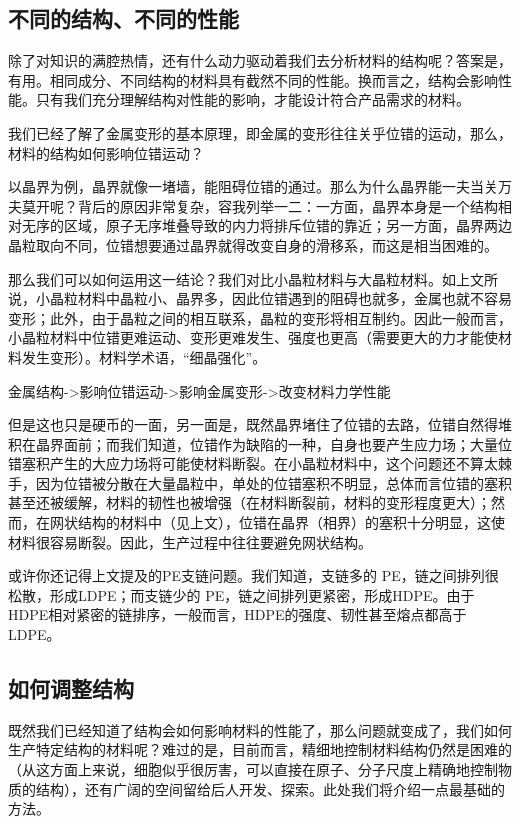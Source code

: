 \subsection{不同的结构、不同的性能}

除了对知识的满腔热情，还有什么动力驱动着我们去分析材料的结构呢？答案是，有用。相同成分、不同结构的材料具有截然不同的性能。换而言之，结构会影响性能。只有我们充分理解结构对性能的影响，才能设计符合产品需求的材料。

我们已经了解了金属变形的基本原理，即金属的变形往往关乎位错的运动，那么，材料的结构如何影响位错运动？

以晶界为例，晶界就像一堵墙，能阻碍位错的通过。那么为什么晶界能一夫当关万夫莫开呢？背后的原因非常复杂，容我列举一二：一方面，晶界本身是一个结构相对无序的区域，原子无序堆叠导致的内力将排斥位错的靠近；另一方面，晶界两边晶粒取向不同，位错想要通过晶界就得改变自身的滑移系，而这是相当困难的。

那么我们可以如何运用这一结论？我们对比小晶粒材料与大晶粒材料。如上文所说，小晶粒材料中晶粒小、晶界多，因此位错遇到的阻碍也就多，金属也就不容易变形；此外，由于晶粒之间的相互联系，晶粒的变形将相互制约。因此一般而言，小晶粒材料中位错更难运动、变形更难发生、强度也更高（需要更大的力才能使材料发生变形）。材料学术语，“细晶强化”。

金属结构->影响位错运动->影响金属变形->改变材料力学性能

但是这也只是硬币的一面，另一面是，既然晶界堵住了位错的去路，位错自然得堆积在晶界面前；而我们知道，位错作为缺陷的一种，自身也要产生应力场；大量位错塞积产生的大应力场将可能使材料断裂。在小晶粒材料中，这个问题还不算太棘手，因为位错被分散在大量晶粒中，单处的位错塞积不明显，总体而言位错的塞积甚至还被缓解，材料的韧性也被增强（在材料断裂前，材料的变形程度更大）；然而，在网状结构的材料中（见上文），位错在晶界（相界）的塞积十分明显，这使材料很容易断裂。因此，生产过程中往往要避免网状结构。

或许你还记得上文提及的PE支链问题。我们知道，支链多的 PE，链之间排列很松散，形成LDPE；而支链少的 PE，链之间排列更紧密，形成HDPE。由于HDPE相对紧密的链排序，一般而言，HDPE的强度、韧性甚至熔点都高于LDPE。

\subsection{如何调整结构}

既然我们已经知道了结构会如何影响材料的性能了，那么问题就变成了，我们如何生产特定结构的材料呢？难过的是，目前而言，精细地控制材料结构仍然是困难的（从这方面上来说，细胞似乎很厉害，可以直接在原子、分子尺度上精确地控制物质的结构），还有广阔的空间留给后人开发、探索。此处我们将介绍一点最基础的方法。

